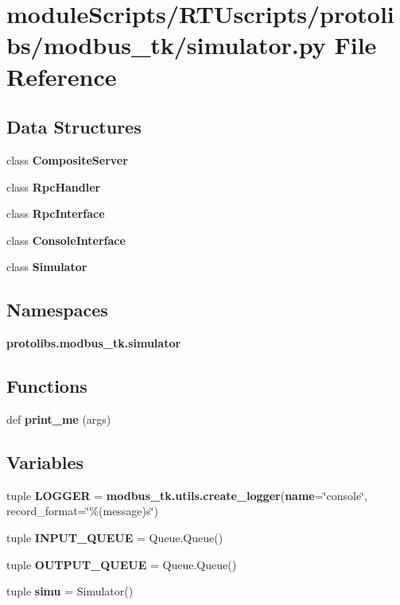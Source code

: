 \section{module\+Scripts/\+R\+T\+Uscripts/protolibs/modbus\+\_\+tk/simulator.py File Reference}
\label{protolibs_2modbus__tk_2simulator_8py}
\subsection*{Data Structures}
\begin{DoxyCompactItemize}
\item 
class {\bf Composite\+Server}
\item 
class {\bf Rpc\+Handler}
\item 
class {\bf Rpc\+Interface}
\item 
class {\bf Console\+Interface}
\item 
class {\bf Simulator}
\end{DoxyCompactItemize}
\subsection*{Namespaces}
\begin{DoxyCompactItemize}
\item 
 {\bf protolibs.\+modbus\+\_\+tk.\+simulator}
\end{DoxyCompactItemize}
\subsection*{Functions}
\begin{DoxyCompactItemize}
\item 
def {\bf print\+\_\+me} (args)
\end{DoxyCompactItemize}
\subsection*{Variables}
\begin{DoxyCompactItemize}
\item 
tuple {\bf L\+O\+G\+G\+E\+R} = {\bf modbus\+\_\+tk.\+utils.\+create\+\_\+logger}({\bf name}=\char`\"{}console\char`\"{}, record\+\_\+format=\char`\"{}\%(message)s\char`\"{})
\item 
tuple {\bf I\+N\+P\+U\+T\+\_\+\+Q\+U\+E\+U\+E} = Queue.\+Queue()
\item 
tuple {\bf O\+U\+T\+P\+U\+T\+\_\+\+Q\+U\+E\+U\+E} = Queue.\+Queue()
\item 
tuple {\bf simu} = Simulator()
\end{DoxyCompactItemize}
